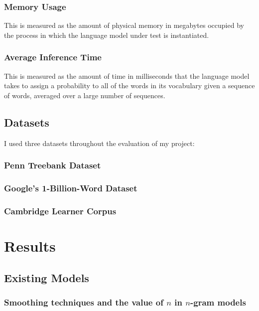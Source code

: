 \documentclass[a4paper, 12pt]{report}
\begin{document}
\subsubsection{Memory Usage}

This is measured as the amount of physical memory in megabytes occupied by the process in which the language model under test is instantiated.

\subsubsection{Average Inference Time}

This is measured as the amount of time in milliseconds that the language model takes to assign a probability to all of the words in its vocabulary given a sequence of words, averaged over a large number of sequences.

\subsection{Datasets}

I used three datasets throughout the evaluation of my project:

\subsubsection{Penn Treebank Dataset}

\subsubsection{Google's 1-Billion-Word Dataset}

\subsubsection{Cambridge Learner Corpus}

\section{Results}

\subsection{Existing Models}

\subsubsection*{Smoothing techniques and the value of $n$ in $n$-gram models}
\end{document}

